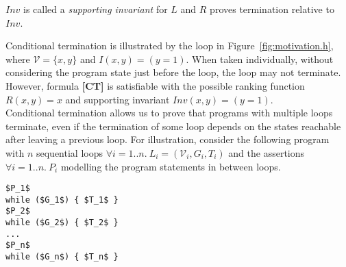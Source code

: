 \documentclass[preprint]{sigplanconf}
\theoremstyle{definition}
\begin{document}
$Inv$ is called a \emph{supporting invariant} for $L$ and $R$ proves termination relative to $Inv$.

Conditional termination is illustrated by the loop in Figure~\ref{fig:motivation.h}, 
where $\mathcal{V} = \{x,y\}$ and $I(x,y) = (y=1)$. 
When taken individually, without considering the program state just before the loop, the loop may not terminate.
However, formula {\bf [CT]} is satisfiable with the possible ranking function $R(x,y) = x$ and supporting invariant $Inv(x,y) = (y = 1)$.\\


Conditional termination allows us to
prove that programs with multiple loops terminate, even if the termination of some loop depends on the states
reachable after leaving a previous loop.
For illustration, consider the following program with $n$ sequential loops $\forall i=1..n. ~L_i=(\mathcal{V}_i,G_i,T_i)$ and
the assertions $\forall i=1..n. ~P_i$ modelling the program statements in between loops. 

\begin{lstlisting}[mathescape=true]
$P_1$
while ($G_1$) { $T_1$ }
$P_2$
while ($G_2$) { $T_2$ }
...
$P_n$
while ($G_n$) { $T_n$ }
\end{lstlisting}
\end{document}

